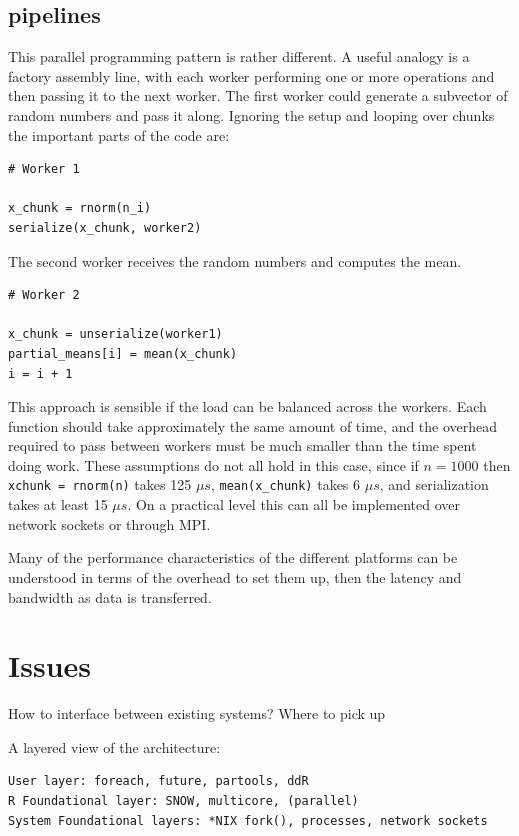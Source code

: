 \documentclass[12pt]{article}
\begin{document}
\subsection{pipelines}

This parallel programming pattern is rather different. A useful analogy is a
factory assembly line, with each worker performing one or more operations
and then passing it to the next worker. The first worker could generate a
subvector of random numbers and pass it along. Ignoring the setup and
looping over chunks the important parts of the code are:

\begin{verbatim}
# Worker 1

x_chunk = rnorm(n_i)
serialize(x_chunk, worker2)
\end{verbatim}

The second worker receives the random numbers and computes the mean.

\begin{verbatim}
# Worker 2

x_chunk = unserialize(worker1)
partial_means[i] = mean(x_chunk)
i = i + 1
\end{verbatim}

This approach is sensible if the load can be balanced across the workers.
Each function should take approximately the same amount of time, and the
overhead required to pass between workers must be much smaller than the
time spent doing work. These assumptions do not all hold in this case,
since if $n = 1000$ then \texttt{xchunk = rnorm(n)} takes 125 $\mu s$,
\texttt{mean(x\_chunk)} takes 6 $\mu s$, and serialization takes at least
15 $\mu s$. On a practical level this can all be implemented over network
sockets or through MPI.


Many of the performance characteristics of the different platforms can be
understood in terms of the overhead to set them up, then the latency and
bandwidth as data is transferred.

\section{Issues}

How to interface between existing systems? Where to pick up

A layered view of the architecture:

\begin{verbatim}
User layer: foreach, future, partools, ddR
R Foundational layer: SNOW, multicore, (parallel)
System Foundational layers: *NIX fork(), processes, network sockets
\end{verbatim}
\end{document}
